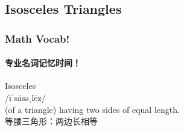 \documentclass[
	11pt, %
	handout,
]{beamer}
\begin{document}

\subsection{Isosceles Triangles}


\begin{frame}
	\frametitle{Math Vocab!} %
	\framesubtitle{专业名词记忆时间！}
	
	{\Huge Isosceles}\\
	{\LARGE /īˈsäsəˌlēz/\\
		\bigskip\bigskip
	(of a triangle) having two sides of equal length. \\ 
	等腰三角形：两边长相等}

\end{frame}

\end{document}
